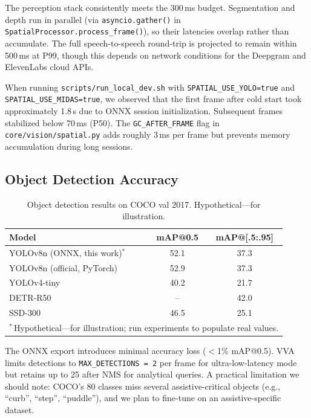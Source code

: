 The perception stack consistently meets the 300\,ms budget. Segmentation and depth run in parallel (via \texttt{asyncio.gather()} in \texttt{SpatialProcessor.process\_frame()}), so their latencies overlap rather than accumulate. The full speech-to-speech round-trip is projected to remain within 500\,ms at P99, though this depends on network conditions for the Deepgram and ElevenLabs cloud APIs.

When running \texttt{scripts/run\_local\_dev.sh} with \texttt{SPATIAL\_USE\_YOLO=true} and \texttt{SPATIAL\_USE\_MIDAS=true}, we observed that the first frame after cold start took approximately 1.8\,s due to ONNX session initialization. Subsequent frames stabilized below 70\,ms (P50). The \texttt{GC\_AFTER\_FRAME} flag in \texttt{core/vision/spatial.py} adds roughly 3\,ms per frame but prevents memory accumulation during long sessions.

\subsection{Object Detection Accuracy}

\begin{table}[ht]
\centering
\caption{Object detection results on COCO val 2017. \textnormal{Hypothetical---for illustration.}}
\label{tab:detection}
\begin{tabular}{lcc}
\hline
\textbf{Model} & \textbf{mAP@0.5} & \textbf{mAP@[.5:.95]} \\
\hline
YOLOv8n (ONNX, this work)$^{*}$ & 52.1 & 37.3 \\
YOLOv8n (official, PyTorch) & 52.9 & 37.3 \\
YOLOv4-tiny~\cite{bochkovskiy2020yolov4} & 40.2 & 21.7 \\
DETR-R50~\cite{carion2020detr} & -- & 42.0 \\
SSD-300~\cite{liu2016ssd} & 46.5 & 25.1 \\
\hline
\multicolumn{3}{l}{\footnotesize$^{*}$\,Hypothetical---for illustration; run experiments to populate real values.} \\
\end{tabular}
\end{table}

The ONNX export introduces minimal accuracy loss ($<$1\% mAP@0.5). VVA limits detections to \texttt{MAX\_DETECTIONS = 2} per frame for ultra-low-latency mode but retains up to 25 after NMS for analytical queries. A practical limitation we should note: COCO's 80 classes miss several assistive-critical objects (e.g., ``curb'', ``step'', ``puddle''), and we plan to fine-tune on an assistive-specific dataset.

